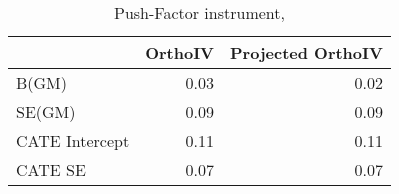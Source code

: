 \begin{table}\centering\caption{Push-Factor instrument, }\begin{tabular}{lrr}
\toprule
                &   OrthoIV &   Projected OrthoIV \\
\midrule
 B(GM)          &      0.03 &                0.02 \\
 SE(GM)         &      0.09 &                0.09 \\
 CATE Intercept &      0.11 &                0.11 \\
 CATE SE        &      0.07 &                0.07 \\
\bottomrule
\end{tabular}\end{table}